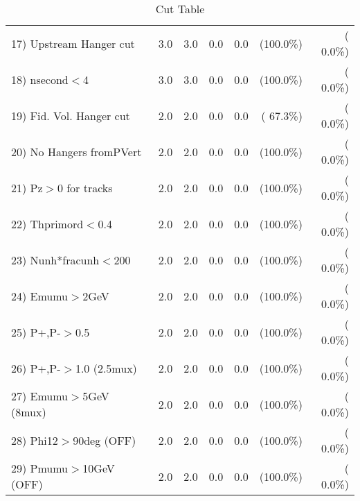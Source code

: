\begin{table}[h!]
\begin{tabular}{||l||r|r|r|r|r|r||}
 17) Upstream Hanger cut  &          3.0 &          3.0 &          0.0 &          0.0 & (100.0\%) & (  0.0\%) \\
 18) nsecond$<$4          &          3.0 &          3.0 &          0.0 &          0.0 & (100.0\%) & (  0.0\%) \\
 19) Fid. Vol. Hanger cut &          2.0 &          2.0 &          0.0 &          0.0 & ( 67.3\%) & (  0.0\%) \\
 20) No Hangers fromPVert &          2.0 &          2.0 &          0.0 &          0.0 & (100.0\%) & (  0.0\%) \\
 21) Pz$>$0 for tracks    &          2.0 &          2.0 &          0.0 &          0.0 & (100.0\%) & (  0.0\%) \\
 22) Thprimord$<$0.4      &          2.0 &          2.0 &          0.0 &          0.0 & (100.0\%) & (  0.0\%) \\
 23) Nunh*fracunh$<$200   &          2.0 &          2.0 &          0.0 &          0.0 & (100.0\%) & (  0.0\%) \\
 24) Emumu$>$2GeV         &          2.0 &          2.0 &          0.0 &          0.0 & (100.0\%) & (  0.0\%) \\
 25) P+,P-$>$0.5          &          2.0 &          2.0 &          0.0 &          0.0 & (100.0\%) & (  0.0\%) \\
 26) P+,P-$>$1.0 (2.5mux) &          2.0 &          2.0 &          0.0 &          0.0 & (100.0\%) & (  0.0\%) \\
 27) Emumu$>$5GeV  (8mux) &          2.0 &          2.0 &          0.0 &          0.0 & (100.0\%) & (  0.0\%) \\
 28) Phi12$>$90deg  (OFF) &          2.0 &          2.0 &          0.0 &          0.0 & (100.0\%) & (  0.0\%) \\
 29) Pmumu$>$10GeV  (OFF) &          2.0 &          2.0 &          0.0 &          0.0 & (100.0\%) & (  0.0\%) \\
 \hline
 \hline
 \end{tabular}
 \caption{Cut Table           }
 \label{tab-cutcohjpsi-mumu_anuecc}
 \end{table}
